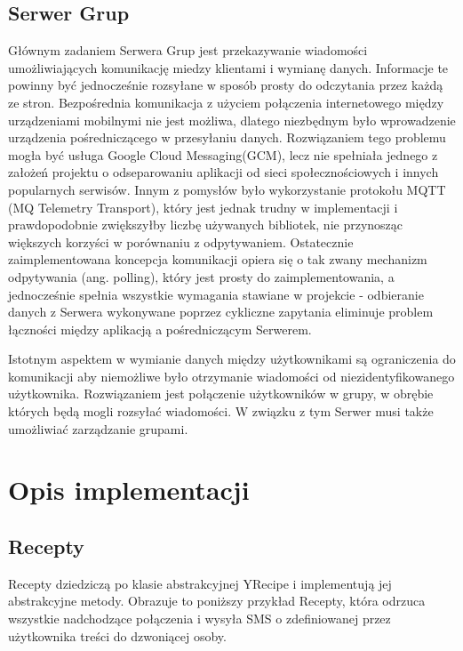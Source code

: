\documentclass[11pt,a4paper,polish,thesis]{dcsbook}
\begin{document}
\section{Serwer Grup}
Głównym zadaniem Serwera Grup jest przekazywanie wiadomości umożliwiających komunikację miedzy klientami i wymianę danych. 
Informacje te powinny być jednocześnie rozsyłane w sposób prosty do odczytania przez każdą ze stron.
Bezpośrednia komunikacja z użyciem połączenia internetowego między urządzeniami mobilnymi nie jest możliwa, dlatego niezbędnym było wprowadzenie urządzenia pośredniczącego w przesyłaniu danych. 
Rozwiązaniem tego problemu mogła być usługa Google Cloud Messaging(GCM), lecz nie spełniała jednego z założeń projektu o odseparowaniu aplikacji od sieci społecznościowych i innych popularnych serwisów.
Innym z pomysłów było wykorzystanie protokołu MQTT (MQ Telemetry Transport), który jest jednak trudny w implementacji i prawdopodobnie zwiększyłby liczbę używanych bibliotek, nie przynosząc większych korzyści w porównaniu z odpytywaniem.
Ostatecznie zaimplementowana koncepcja komunikacji opiera się o tak zwany mechanizm odpytywania (ang. polling), który jest prosty do zaimplementowania, a jednocześnie spełnia wszystkie wymagania stawiane w projekcie - odbieranie danych z Serwera wykonywane poprzez cykliczne zapytania eliminuje problem łączności między aplikacją a pośredniczącym Serwerem.

Istotnym aspektem w wymianie danych między użytkownikami są ograniczenia do komunikacji aby niemożliwe było otrzymanie wiadomości od niezidentyfikowanego użytkownika.
Rozwiązaniem jest połączenie użytkowników w grupy, w obrębie których będą mogli rozsyłać wiadomości. W związku z tym Serwer musi także umożliwiać zarządzanie grupami.

\chapter{Opis implementacji}

\section{Recepty}
Recepty dziedziczą po klasie abstrakcyjnej YRecipe i implementują jej abstrakcyjne metody. Obrazuje to poniższy przykład Recepty, która odrzuca wszystkie nadchodzące połączenia i wysyła SMS o zdefiniowanej przez użytkownika treści do dzwoniącej osoby.
\end{document}
